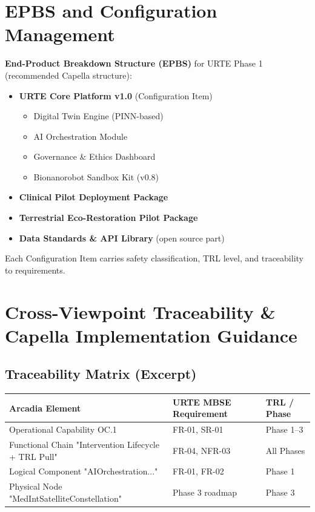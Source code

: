 \documentclass[11pt,a4paper]{report}
\begin{document}
\chapter{EPBS and Configuration Management}

\textbf{End-Product Breakdown Structure (EPBS)} for URTE Phase 1 (recommended Capella structure):

\begin{itemize}
    \item \textbf{URTE Core Platform v1.0} (Configuration Item)
          \begin{itemize}
              \item Digital Twin Engine (PINN-based)
              \item AI Orchestration Module
              \item Governance \& Ethics Dashboard
              \item Bionanorobot Sandbox Kit (v0.8)
          \end{itemize}
    \item \textbf{Clinical Pilot Deployment Package}
    \item \textbf{Terrestrial Eco-Restoration Pilot Package}
    \item \textbf{Data Standards \& API Library} (open source part)
\end{itemize}

Each Configuration Item carries safety classification, TRL level, and traceability to requirements.

\chapter{Cross-Viewpoint Traceability \& Capella Implementation Guidance}

\section{Traceability Matrix (Excerpt)}

\begin{tabular}{lll}
\toprule
\textbf{Arcadia Element} & \textbf{URTE MBSE Requirement} & \textbf{TRL / Phase} \\
\midrule
Operational Capability OC.1 & FR-01, SR-01 & Phase 1--3 \\
Functional Chain "Intervention Lifecycle + TRL Pull" & FR-04, NFR-03 & All Phases \\
Logical Component "AIOrchestration..." & FR-01, FR-02 & Phase 1 \\
Physical Node "MedIntSatelliteConstellation" & Phase 3 roadmap & Phase 3 \\
\bottomrule
\end{tabular}
\end{document}
